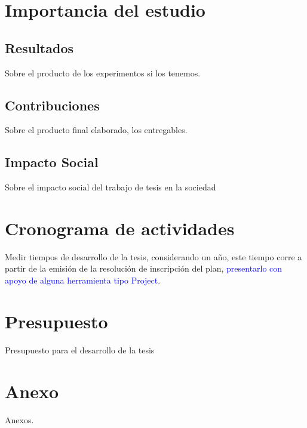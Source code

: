 \section{Importancia del estudio}
\subsection{Resultados}
Sobre el producto de los experimentos si los tenemos.
\subsection{Contribuciones}
Sobre el producto final elaborado, los entregables.
\subsection{Impacto Social}
Sobre el impacto social del trabajo de tesis en la sociedad

\section{Cronograma de actividades}
Medir tiempos de desarrollo de la tesis, considerando un año, este tiempo corre a partir de la emisión de la resolución de inscripción del plan, \textcolor{blue}{presentarlo con apoyo de alguna herramienta tipo Project}.

\section{Presupuesto}
Presupuesto para el desarrollo de la tesis

\section{Anexo}
Anexos.
